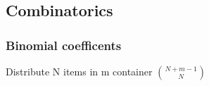\documentclass{article}
\begin{document}
\begin{multicols*}{2}
			\subsection{Combinatorics}
				
				\subsubsection{Binomial coefficents}
				Distribute N items in m container
				$\binom{N+m-1}{N}$
		
				
				
				
					

	\newpage
		

\end{multicols*}
\end{document}
